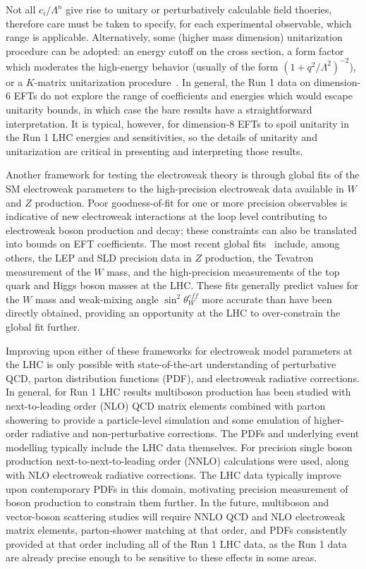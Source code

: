 Not all $c_i/\Lambda^n$ give rise to unitary or perturbatively
calculable field thoeries, therefore care must be taken to specify,
for each experimental observable, which range is applicable.
Alternatively, some (higher mass dimension) unitarization procedure
can be adopted: an energy cutoff on the cross section, a form factor
which moderates the high-energy behavior (usually of the form
$(1+q^2/\Lambda^2)^{-2}$), or a $K$-matrix unitarization
procedure~\cite{Alboteanu:2008my,Chung:1995dx}.  In general, the Run 1
data on dimension-6 EFTs do not explore the range of coefficients and
energies which would escape unitarity bounds, in which case the bare
results have a straightforward interpretation.  It is typical,
however, for dimension-8 EFTs to spoil unitarity in the Run 1 LHC
energies and sensitivities, so the details of unitarity and
unitarization are critical in presenting and interpreting those
results.

Another framework for testing the electroweak theory is through global
fits of the SM electroweak parameters to the high-precision
electroweak data available in $W$ and $Z$ production.  Poor
goodness-of-fit for one or more precision observables is indicative of
new electroweak interactions at the loop level contributing to
electroweak boson production and decay; these constraints can also be
translated into bounds on EFT coefficients.  The most recent global
fits~\cite{Baak:2014ora,Ciuchini:2013pca} include, among others, the
LEP and SLD precision data in $Z$ production, the Tevatron measurement
of the $W$ mass, and the high-precision measurements of the top quark
and Higgs boson masses at the LHC.  These fits generally predict
values for the $W$ mass and weak-mixing angle $\sin^2\theta^{eff}_{W}$
more accurate than have been directly obtained, providing an
opportunity at the LHC to over-constrain the global fit further.

Improving upon either of these frameworks for electroweak model
parameters at the LHC is only possible with state-of-the-art
understanding of perturbative QCD, parton distribution functions
(PDF), and electroweak radiative corrections.  In general, for Run 1
LHC results multiboson production has been studied with
next-to-leading order (NLO) QCD matrix elements combined with parton
showering to provide a particle-level simulation and some emulation of
higher-order radiative and non-perturbative corrections. The PDFs and
underlying event modelling typically include the LHC data themselves.
For precision single boson production next-to-next-to-leading order
(NNLO) calculations were used, along with NLO electroweak radiative
corrections.  The LHC data typically improve upon contemporary PDFs in
this domain, motivating precision measurement of boson production to
constrain them further.  In the future, multiboson and vector-boson
scattering studies will require NNLO QCD and NLO electroweak matrix
elements, parton-shower matching at that order, and PDFs consistently
provided at that order including all of the Run 1 LHC data, as the Run
1 data are already precise enough to be sensitive to these effects in
some areas.
